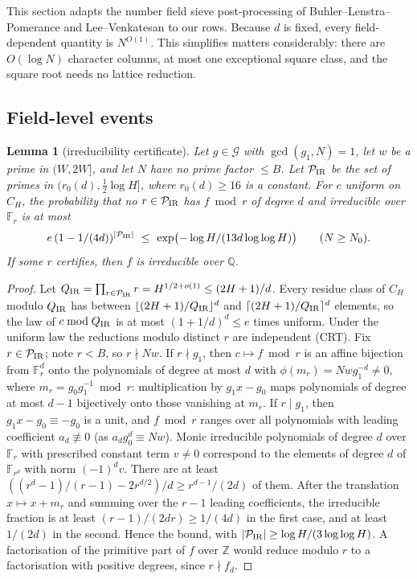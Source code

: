 \documentclass[11pt]{amsart}
\newtheorem{lemma}[theorem]{Lemma}
\theoremstyle{definition}
\newcommand{\Z}{\mathbb{Z}}
\newcommand{\Q}{\mathbb{Q}}
\newcommand{\F}{\mathbb{F}}
\newcommand{\cG}{\mathcal{G}}
\newcommand{\cP}{\mathcal{P}}
\begin{document}
This section adapts the number field sieve post-processing of Buhler--Lenstra--Pomerance \cite{blp1993} and
Lee--Venkatesan \cite[\S6]{lv2018} to our rows. Because $d$ is fixed, every field-dependent quantity is
$N^{O(1)}$. This simplifies matters considerably: there are $O(\log N)$ character columns, at most one
exceptional square class, and the square root needs no lattice reduction.

\subsection{Field-level events}\label{sec:fieldevents}

\begin{lemma}[irreducibility certificate]\label{lem:IR}
Let $g\in\cG$ with $\gcd(g_1,N)=1$, let $w$ be a prime in $(W,2W]$, and let $N$ have no prime factor $\le B$. Let $\cP_{\rm IR}$ be
the set of primes in $(r_0(d),\frac12\log H]$, where $r_0(d)\ge16$ is a constant. For $c$ uniform on $C_H$, the probability that no
$r\in\cP_{\rm IR}$ has $f\bmod r$ of degree $d$ and irreducible over $\F_r$ is at most
\[
e\,(1-1/(4d))^{|\cP_{\rm IR}|}\ \le\ \exp\bigl(-\log H/(13d\log\log H)\bigr)\qquad(N\ge N_0).
\]
If some $r$ certifies, then $f$ is irreducible over $\Q$.
\end{lemma}

\begin{proof}
Let $Q_{\rm IR}=\prod_{r\in\cP_{\rm IR}}r=H^{1/2+o(1)}\le(2H+1)/d$. Every residue class of $C_H$ modulo $Q_{\rm IR}$ has between
$\lfloor(2H+1)/Q_{\rm IR}\rfloor^d$ and $\lceil(2H+1)/Q_{\rm IR}\rceil^d$ elements, so the law of $c\bmod Q_{\rm IR}$ is at most $(1+1/d)^d\le e$ times
uniform. Under the uniform law the reductions modulo distinct $r$ are independent (CRT). Fix $r\in\cP_{\rm IR}$; note $r<B$, so
$r\nmid Nw$. If $r\nmid g_1$, then $c\mapsto f\bmod r$ is an affine bijection from $\F_r^d$ onto the polynomials of degree at most $d$ with
$\phi(m_r)=Nwg_1^{-d}\ne0$, where $m_r=g_0g_1^{-1}\bmod r$: multiplication by $g_1x-g_0$ maps polynomials of degree at most $d-1$ bijectively onto
those vanishing at $m_r$. If $r\mid g_1$, then $g_1x-g_0\equiv-g_0$ is a unit, and $f\bmod r$ ranges over all polynomials with leading
coefficient $a_d\not\equiv0$ (as $a_dg_0^d\equiv Nw$). Monic irreducible polynomials of degree $d$ over $\F_r$ with prescribed constant term
$v\ne0$ correspond to the elements of degree $d$ of $\F_{r^d}$ with norm $(-1)^dv$. There are at least
$((r^d-1)/(r-1)-2r^{d/2})/d\ge r^{d-1}/(2d)$ of them. After the translation $x\mapsto x+m_r$ and summing over the $r-1$ leading coefficients, the
irreducible fraction is at least $(r-1)/(2dr)\ge1/(4d)$ in the first case, and at least $1/(2d)$ in the second. Hence the bound,
with $|\cP_{\rm IR}|\ge\log H/(3\log\log H)$. A factorisation of the primitive part of $f$ over $\Z$ would reduce modulo $r$ to a
factorisation with positive degrees, since $r\nmid f_d$.
\end{proof}
\end{document}
